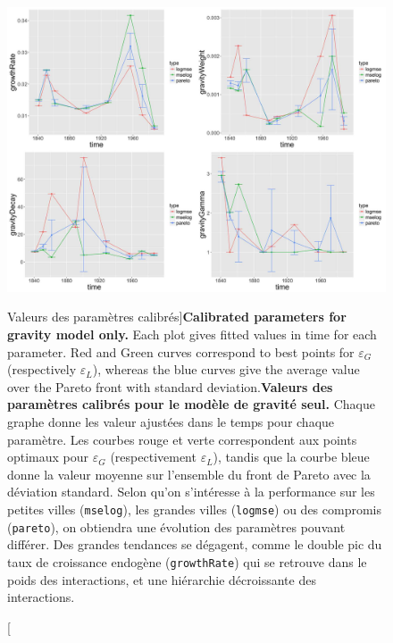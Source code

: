 \begin{figure}
\includegraphics[width=\linewidth]{Figures/Final/4-3-2-fig-interactiongibrat-gravity-params}
\caption[Calibrated parameters][Valeurs des paramètres calibrés]{\textbf{Calibrated parameters for gravity model only.} Each plot gives fitted values in time for each parameter. Red and Green curves correspond to best points for $\varepsilon_G$ (respectively $\varepsilon_L$), whereas the blue curves give the average value over the Pareto front with standard deviation.\label{fig:interactiongibrat:gravity-params}}{\textbf{Valeurs des paramètres calibrés pour le modèle de gravité seul.} Chaque graphe donne les valeur ajustées dans le temps pour chaque paramètre. Les courbes rouge et verte correspondent aux points optimaux pour $\varepsilon_G$ (respectivement $\varepsilon_L$), tandis que la courbe bleue donne la valeur moyenne sur l'ensemble du front de Pareto avec la déviation standard. Selon qu'on s'intéresse à la performance sur les petites villes (\texttt{mselog}), les grandes villes (\texttt{logmse}) ou des compromis (\texttt{pareto}), on obtiendra une évolution des paramètres pouvant différer. Des grandes tendances se dégagent, comme le double pic du taux de croissance endogène (\texttt{growthRate}) qui se retrouve dans le poids des interactions, et une hiérarchie décroissante des interactions.\label{fig:interactiongibrat:gravity-params}}
\end{figure}


